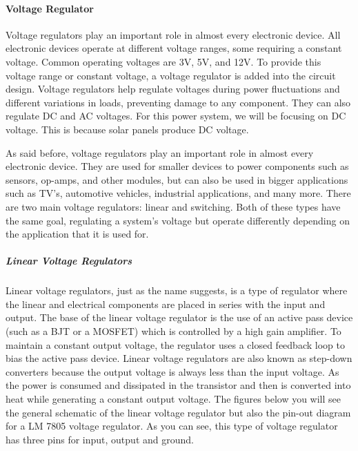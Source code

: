 \paragraph{Voltage Regulator}
Voltage regulators play an important role in almost every electronic device. All electronic devices operate at different voltage ranges, some requiring a constant voltage. Common operating voltages are 3V, 5V, and 12V. To provide this voltage range or constant voltage, a voltage regulator is added into the circuit design. Voltage regulators help regulate voltages during power fluctuations and different variations in loads, preventing damage to any component. They can also regulate DC and AC voltages. For this power system, we will be focusing on DC voltage. This is because solar panels produce DC voltage. \par
As said before, voltage regulators play an important role in almost every electronic device. They are used for smaller devices to power components such as sensors, op-amps, and other modules, but can also be used in bigger applications such as TV’s, automotive vehicles, industrial applications, and many more. There are two main voltage regulators: linear and switching. Both of these types have the same goal, regulating a system’s voltage but operate differently depending on the application that it is used for. \par
\subparagraph{Linear Voltage Regulators}
Linear voltage regulators, just as the name suggests, is a type of regulator where the linear and electrical components are placed in series with the input and output. The base of the linear voltage regulator is the use of an active pass device (such as a BJT or a MOSFET) which is controlled by a high gain amplifier. To maintain a constant output voltage, the regulator uses a closed feedback loop to bias the active pass device. Linear voltage regulators are also known as step-down converters because the output voltage is always less than the input voltage. As the power is consumed and dissipated in the transistor and then is converted into heat while generating a constant output voltage. The figures below you will see the general schematic of the linear voltage regulator but also the pin-out diagram for a LM 7805 voltage regulator. As you can see, this type of voltage regulator has three pins for input, output and ground.\par
